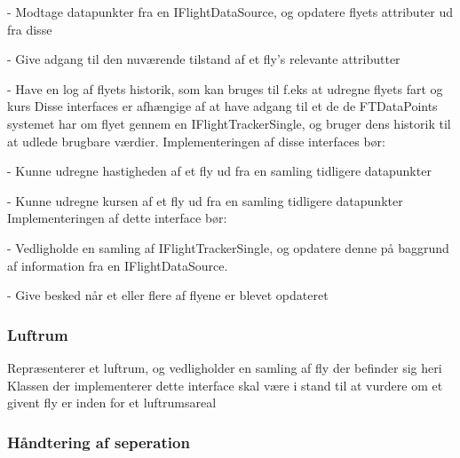 - Modtage datapunkter fra en IFlightDataSource, og opdatere flyets attributer ud fra disse

- Give adgang til den nuværende tilstand af et fly's relevante attributter

- Have en log af flyets historik, som kan bruges til f.eks at udregne flyets fart og kurs
Disse interfaces er afhængige af at have adgang til et de de FTDataPoints systemet har om flyet gennem en IFlightTrackerSingle, og bruger dens historik til at udlede brugbare værdier.
Implementeringen af disse interfaces bør:

- Kunne udregne hastigheden af et fly ud fra en samling tidligere datapunkter

- Kunne udregne kursen af et fly ud fra en samling tidligere datapunkter
Implementeringen af dette interface bør:

- Vedligholde en samling af IFlightTrackerSingle, og opdatere denne på baggrund af information fra en IFlightDataSource.

- Give besked når et eller flere af flyene er blevet opdateret
\newpage
\subsubsection{Luftrum}

Repræsenterer et luftrum, og vedligholder en samling af fly der befinder sig heri
Klassen der implementerer dette interface skal være i stand til at vurdere om et givent fly er inden for et luftrumsareal
\subsubsection{Håndtering af seperation}
